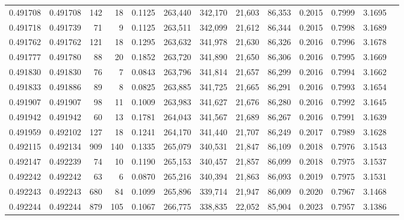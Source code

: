 \begin{tabular}{rrrrrrrrrrrrr}
0.491708 & 0.491708 &   142 &    18 &                                     0.1125 & 263,440 & 342,170 &  21,603 &  86,353 & 0.2015 & 0.7999 & 3.1695 \\
0.491718 & 0.491739 &    71 &     9 &                                     0.1125 & 263,511 & 342,099 &  21,612 &  86,344 & 0.2015 & 0.7998 & 3.1689 \\
0.491762 & 0.491762 &   121 &    18 &                                     0.1295 & 263,632 & 341,978 &  21,630 &  86,326 & 0.2016 & 0.7996 & 3.1678 \\
0.491777 & 0.491780 &    88 &    20 &                                     0.1852 & 263,720 & 341,890 &  21,650 &  86,306 & 0.2016 & 0.7995 & 3.1669 \\
0.491830 & 0.491830 &    76 &     7 &                                     0.0843 & 263,796 & 341,814 &  21,657 &  86,299 & 0.2016 & 0.7994 & 3.1662 \\
0.491833 & 0.491886 &    89 &     8 &                                     0.0825 & 263,885 & 341,725 &  21,665 &  86,291 & 0.2016 & 0.7993 & 3.1654 \\
0.491907 & 0.491907 &    98 &    11 &                                     0.1009 & 263,983 & 341,627 &  21,676 &  86,280 & 0.2016 & 0.7992 & 3.1645 \\
0.491942 & 0.491942 &    60 &    13 &                                     0.1781 & 264,043 & 341,567 &  21,689 &  86,267 & 0.2016 & 0.7991 & 3.1639 \\
0.491959 & 0.492102 &   127 &    18 &                                     0.1241 & 264,170 & 341,440 &  21,707 &  86,249 & 0.2017 & 0.7989 & 3.1628 \\
0.492115 & 0.492134 &   909 &   140 &                                     0.1335 & 265,079 & 340,531 &  21,847 &  86,109 & 0.2018 & 0.7976 & 3.1543 \\
0.492147 & 0.492239 &    74 &    10 &                                     0.1190 & 265,153 & 340,457 &  21,857 &  86,099 & 0.2018 & 0.7975 & 3.1537 \\
0.492242 & 0.492242 &    63 &     6 &                                     0.0870 & 265,216 & 340,394 &  21,863 &  86,093 & 0.2019 & 0.7975 & 3.1531 \\
0.492243 & 0.492243 &   680 &    84 &                                     0.1099 & 265,896 & 339,714 &  21,947 &  86,009 & 0.2020 & 0.7967 & 3.1468 \\
0.492244 & 0.492244 &   879 &   105 &                                     0.1067 & 266,775 & 338,835 &  22,052 &  85,904 & 0.2023 & 0.7957 & 3.1386 \\

\end{tabular}
